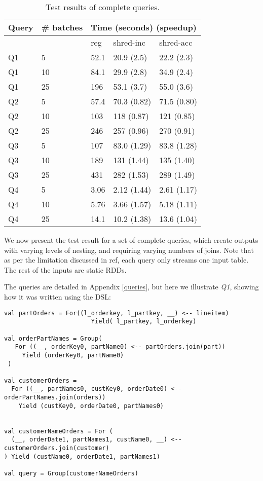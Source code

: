 \begin{table}[]
\begin{tabular}{|l|l|l|l|l|}
\hline
Query & \# batches & \multicolumn{3}{l|}{Time (seconds) (speedup)} \\ \hline
      &            & reg       & shred-inc       & shred-acc       \\ \hline
Q1    & 5          & 52.1      & 20.9 (2.5)      & 22.2 (2.3)      \\ \hline
Q1    & 10         & 84.1      & 29.9 (2.8)      & 34.9 (2.4)      \\ \hline
Q1    & 25         & 196       & 53.1 (3.7)      & 55.0 (3.6)      \\ \hline
Q2    & 5          & 57.4      & 70.3 (0.82)     & 71.5 (0.80)     \\ \hline
Q2    & 10         & 103       & 118 (0.87)      & 121 (0.85)      \\ \hline
Q2    & 25         & 246       & 257 (0.96)      & 270 (0.91)      \\ \hline
Q3    & 5          & 107       & 83.0 (1.29)     & 83.8 (1.28)     \\ \hline
Q3    & 10         & 189       & 131 (1.44)      & 135 (1.40)      \\ \hline
Q3    & 25         & 431       & 282 (1.53)      & 289 (1.49)      \\ \hline
Q4    & 5          & 3.06      & 2.12 (1.44)     & 2.61 (1.17)     \\ \hline
Q4    & 10         & 5.76      & 3.66 (1.57)     & 5.18 (1.11)     \\ \hline
Q4    & 25         & 14.1      & 10.2 (1.38)     & 13.6 (1.04)     \\ \hline
\end{tabular}
\caption{Test results of complete queries.}
\label{mainresults}
\end{table}

We now present the test result for a set of complete queries, which create outputs with varying levels of nesting, and requiring varying numbers of joins. Note that as per the limitation discussed in ref{}, each query only streams one input table. The rest of the inputs are static RDDs.

The queries are detailed in Appendix \ref{queries}, but here we illustrate \textit{Q1}, showing how it was written using the DSL:
\vs\begin{lstlisting}
val partOrders = For((l_orderkey, l_partkey, __) <-- lineitem)
                        Yield( l_partkey, l_orderkey)
                        
val orderPartNames = Group(
   For ((__, orderKey0, partName0) <-- partOrders.join(part))
     Yield (orderKey0, partName0)
 )

val customerOrders =
  For ((__, partNames0, custKey0, orderDate0) <-- orderPartNames.join(orders))
    Yield (custKey0, orderDate0, partNames0)


val customerNameOrders = For (
  (__, orderDate1, partNames1, custName0, __) <-- customerOrders.join(customer)
) Yield (custName0, orderDate1, partNames1)

val query = Group(customerNameOrders)
\end{lstlisting}\vs

